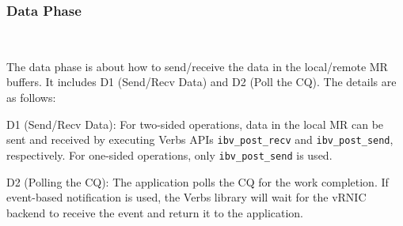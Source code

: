 \subsubsection{\textbf{Data Phase}}
\
\noindent

The data phase is about how to send/receive the data in the local/remote MR buffers. It includes D1 (Send/Recv Data) and D2 (Poll the CQ). The details are as follows:


D1 (Send/Recv Data): For two-sided operations, data in the local MR can be sent and received by executing Verbs APIs \texttt{ibv\_post\_recv} and \texttt{ibv\_post\_send}, respectively. For one-sided operations, only \texttt{ibv\_post\_send} is used.


D2 (Polling the CQ): The application polls the CQ for the work completion. If event-based notification is used, the Verbs library will wait for the vRNIC backend to receive the event and return it to the application.
